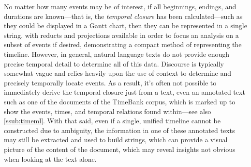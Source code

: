 \documentclass[a4paper,12pt,leqno,twoside]{article}
\begin{document}
No matter how many events may be of interest, if all beginnings, endings, and durations are known---that is, the \textit{temporal closure} has been calculated---such as they could be displayed in a Gantt chart, then they can be represented in a single string, with reducts and projections available in order to focus an analysis on a subset of events if desired, demonstrating a compact method of representing the timeline. However, in general, natural language texts do not provide enough precise temporal detail to determine all of this data. Discourse is typically somewhat vague and relies heavily upon the use of context to determine and precisely temporally locate events. As a result, it's often not possible to immediately derive the temporal closure just from a text, even an annotated text such as one of the documents of the TimeBank \citep{pustejovsky2006timebank} corpus, which is marked up to show the events, times, and temporal relations found within---see also \cref{ssub:timeml}. With that said, even if a single, unified timeline cannot be constructed due to ambiguity, the information in one of these annotated texts may still be extracted and used to build strings, which can provide a visual picture of the content of the document, which may reveal insights not obvious when looking at the text alone.
\end{document}
